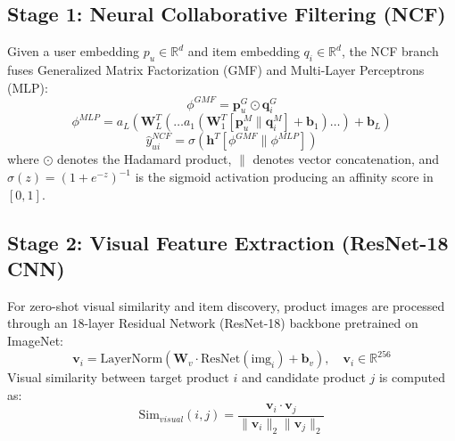 \documentclass[conference]{IEEEtran}
\begin{document}
\subsection{Stage 1: Neural Collaborative Filtering (NCF)}
Given a user embedding $p_u \in \mathbb{R}^d$ and item embedding $q_i \in \mathbb{R}^d$, the NCF branch fuses Generalized Matrix Factorization (GMF) and Multi-Layer Perceptrons (MLP):
\begin{equation}
\phi^{GMF} = \mathbf{p}_u^G \odot \mathbf{q}_i^G
\end{equation}
\begin{equation}
\phi^{MLP} = a_L \left( \mathbf{W}_L^T \left( \dots a_1(\mathbf{W}_1^T [\mathbf{p}_u^M \parallel \mathbf{q}_i^M] + \mathbf{b}_1) \dots \right) + \mathbf{b}_L \right)
\end{equation}
\begin{equation}
\hat{y}_{ui}^{NCF} = \sigma \left( \mathbf{h}^T [\phi^{GMF} \parallel \phi^{MLP}] \right)
\end{equation}
where $\odot$ denotes the Hadamard product, $\parallel$ denotes vector concatenation, and $\sigma(z) = (1 + e^{-z})^{-1}$ is the sigmoid activation producing an affinity score in $[0, 1]$.

\subsection{Stage 2: Visual Feature Extraction (ResNet-18 CNN)}
For zero-shot visual similarity and item discovery, product images are processed through an 18-layer Residual Network (ResNet-18) backbone pretrained on ImageNet:
\begin{equation}
\mathbf{v}_i = \text{LayerNorm}\left(\mathbf{W}_v \cdot \text{ResNet}(\text{img}_i) + \mathbf{b}_v\right), \quad \mathbf{v}_i \in \mathbb{R}^{256}
\end{equation}
Visual similarity between target product $i$ and candidate product $j$ is computed as:
\begin{equation}
\text{Sim}_{visual}(i, j) = \frac{\mathbf{v}_i \cdot \mathbf{v}_j}{\|\mathbf{v}_i\|_2 \|\mathbf{v}_j\|_2}
\end{equation}
\end{document}
